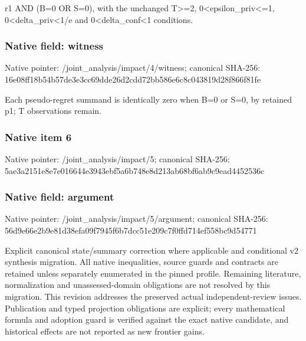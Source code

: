 \documentclass[10pt,a4paper]{article}
\begin{document}
\begingroup\raggedright\sloppy r1 AND (B=\allowbreak{}0 OR S=\allowbreak{}0),\allowbreak{} with the unchanged T>=\allowbreak{}2,\allowbreak{} 0<epsilon\_\allowbreak{}priv<=\allowbreak{}1,\allowbreak{} 0<delta\_\allowbreak{}priv<1/\allowbreak{}e and 0<delta\_\allowbreak{}conf<1 conditions.\par\endgroup

\subsubsection{Native field: witness}
Native pointer: /joint\_\allowbreak{}analysis/impact/4/witness; canonical SHA-256: 16e08ff18b54b57de3e3cc69dde26d2cdd72bb586e6c8c043819d28f866f81fe

\begingroup\raggedright\sloppy Each pseudo-regret summand is identically zero when B=\allowbreak{}0 or S=\allowbreak{}0,\allowbreak{} by retained p1;\allowbreak{} T observations remain.\par\endgroup

\subsubsection{Native item 6}
Native pointer: /joint\_\allowbreak{}analysis/impact/5; canonical SHA-256: 5ae3a2151e8e7e016644e3943ebf5a6b748e8d213ab68bf6ab9c9ead4452536c

\subsubsection{Native field: argument}
Native pointer: /joint\_\allowbreak{}analysis/impact/5/argument; canonical SHA-256: 56d9e66e2b9e81d38efa09f7945f6b7dcc51e209c7f0ffd714ef558bc9d54771

\begingroup\raggedright\sloppy Explicit canonical state/\allowbreak{}summary correction where applicable and conditional v2 synthesis migration. All native inequalities,\allowbreak{} source guards and contracts are retained unless separately enumerated in the pinned profile. Remaining literature,\allowbreak{} normalization and unassessed-domain obligations are not resolved by this migration. This revision addresses the preserved actual independent-review issues. Publication and typed projection obligations are explicit;\allowbreak{} every mathematical formula and adoption guard is verified against the exact native candidate,\allowbreak{} and historical effects are not reported as new frontier gains.\par\endgroup
\end{document}
